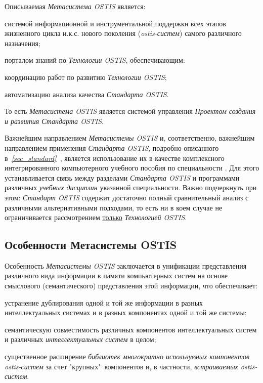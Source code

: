 Описываемая \textit{Метасистема OSTIS} является:

\begin{textitemize}
	\item системой информационной и инструментальной поддержки всех этапов жизненного цикла и.к.с. нового поколения (\textit{ostis-систем}) самого различного назначения;
	\item порталом знаний по \textit{Технологии OSTIS}, обеспечивающим:
		\begin{textitemize}
			\item координацию работ по развитию \textit{Технологии OSTIS};
			\item автоматизацию анализа качества \textit{Стандарта OSTIS}.
		\end{textitemize}
	То есть \textit{Метасистема OSTIS} является системой управления \textit{Проектом создания и развития Стандарта OSTIS}.	
\end{textitemize}

Важнейшим направлением \textit{Метасистемы OSTIS} и, соответственно, важнейшим направлением применения \textit{Стандарта OSTIS}, подробно описанного в~\textit{\ref{sec_standard}~}, является использование их в качестве комплексного интегрированного компьютерного учебного пособия по специальности . Для этого устанавливается связь между разделами \textit{Стандарта OSTIS} и программами различных \textit{учебных дисциплин} указанной специальности. Важно подчеркнуть при этом: \textit{Стандарт OSTIS} содержит достаточно полный сравнительный анализ с различными альтернативными подходами, то есть ни в коем случае не ограничивается рассмотрением \uline{только} \textit{Технологией OSTIS}.

\subsection{Особенности Метасистемы OSTIS}
\label{ims_peculiarities}

Особенность \textit{Метасистемы OSTIS} заключается в унификации представления различного вида информации в памяти компьютерных систем на основе смыслового (семантического) представления этой информации, что обеспечивает:
	\begin{textitemize}
		\item устранение дублирования одной и той же информации в разных интеллектуальных системах и в разных компонентах одной и той же системы;
		\item семантическую совместимость различных компонентов интеллектуальных систем и различных \textit{интеллектуальных систем} в целом;
		\item существенное расширение \textit{библиотек многократно используемых компонентов ostis-систем} за счет "крупных"\ компонентов и, в частности, \textit{встраиваемых ostis-систем}.
	\end{textitemize}

